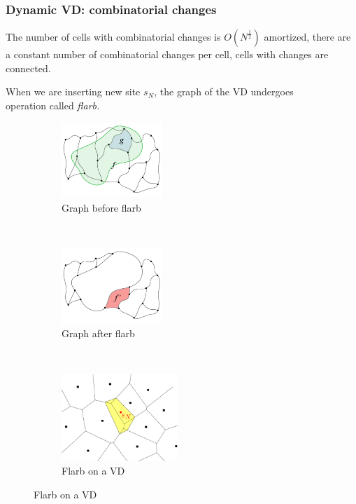 \begin{frame} \frametitle{Dynamic VD: combinatorial changes}
\vspace{2mm}
\begin{theorem}
\label{thm:amorCost} \small
	The number of cells with combinatorial changes is $O(N^{\frac12})$ amortized, there are a constant number of combinatorial changes per cell, cells with changes are connected.
\end{theorem} \medskip \pause

When we are inserting new site $s_N$, the graph of the VD undergoes \\
operation called {\it flarb.} \vspace{-4mm}

\begin{figure}[h]
\centering
	\begin{subfigure}[t]{0.28\textwidth}
	\centering
	\includegraphics[width=3.8cm]{flarb/2flarb}
	\caption{Graph before flarb}
	\label{fig:flarb}
	\end{subfigure}
~
	\begin{subfigure}[t]{0.28\textwidth}
	\centering
	\includegraphics[width=3.8cm]{flarb/3afterflarb}
	\caption{Graph after flarb}
	\label{fig:afterflarb}
	\end{subfigure}
~
	\begin{subfigure}[t]{0.37\textwidth}
	\centering
	\includegraphics[width=4.4cm]{figs/identFlarb}
	\caption{Flarb on a VD}
	\label{fig:afterflarb}
	\end{subfigure}
\label{fig:exflarb}
\end{figure} \end{frame}


